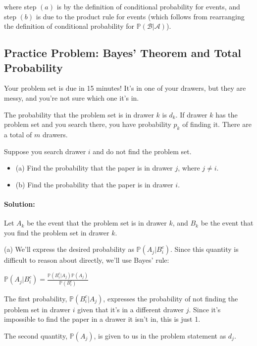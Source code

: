 \documentclass[6008notes.tex]{subfiles}
\begin{document}
where step $(a)$ is by the definition of conditional probability for events, and step $(b)$ is due to the product rule for events (which follows from rearranging the definition of conditional probability for $\mathbb {P}(\mathcal{B} | \mathcal{A})$).

\subsection{Practice Problem: Bayes' Theorem and Total Probability}

Your problem set is due in 15 minutes! It's in one of your drawers, but they are messy, and you're not sure which one it's in.

The probability that the problem set is in drawer $k$ is $d_k$. If drawer $k$ has the problem set and you search there, you have probability $p_k$ of finding it. There are a total of $m$ drawers.

Suppose you search drawer $i$ and do not find the problem set.

\begin{itemize}
\item (a) Find the probability that the paper is in drawer $j$, where $j \neq i$.

\item (b) Find the probability that the paper is in drawer $i$.
\end{itemize}

\paragraph{Solution:} Let $A_k$ be the event that the problem set is in drawer $k$, and $B_k$ be the event that you find the problem set in drawer $k$.

(a) We'll express the desired probability as $\mathbb {P}(A_ j|B_ i^ c)$. Since this quantity is difficult to reason about directly, we'll use Bayes' rule:

{\centering$\mathbb {P}(A_ j|B_ i^ c) = \frac{\mathbb {P}(B_ i^ c | A_ j) \mathbb {P}(A_ j)}{\mathbb {P}(B_ i^ c)}$ \par}
 
The first probability, $\mathbb {P}(B_ i^ c | A_ j)$, expresses the probability of not finding the problem set in drawer $i$ given that it's in a different drawer $j$. Since it's impossible to find the paper in a drawer it isn't in, this is just 1.

The second quantity, $\mathbb {P}(A_ j)$, is given to us in the problem statement as $d_j$.
\end{document}
